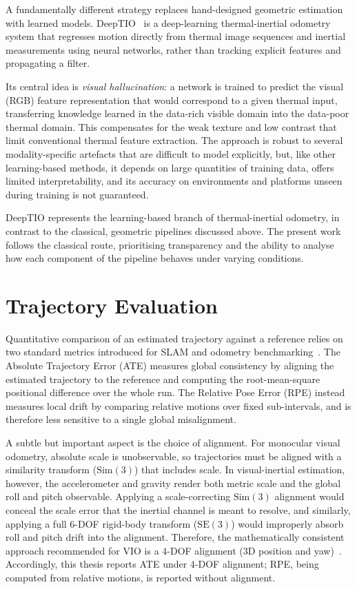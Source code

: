 A fundamentally different strategy replaces hand-designed geometric estimation with learned models. DeepTIO~\cite{Saputra_2020} is a deep-learning thermal-inertial odometry system that regresses motion directly from thermal image sequences and inertial measurements using neural networks, rather than tracking explicit features and propagating a filter.

Its central idea is \emph{visual hallucination}: a network is trained to predict the visual (RGB) feature representation that would correspond to a given thermal input, transferring knowledge learned in the data-rich visible domain into the data-poor thermal domain. This compensates for the weak texture and low contrast that limit conventional thermal feature extraction. The approach is robust to several modality-specific artefacts that are difficult to model explicitly, but, like other learning-based methods, it depends on large quantities of training data, offers limited interpretability, and its accuracy on environments and platforms unseen during training is not guaranteed.

DeepTIO represents the learning-based branch of thermal-inertial odometry, in contrast to the classical, geometric pipelines discussed above. The present work follows the classical route, prioritising transparency and the ability to analyse how each component of the pipeline behaves under varying conditions.

\section{Trajectory Evaluation}
\label{sec:rw_eval}

Quantitative comparison of an estimated trajectory against a reference relies on two standard metrics introduced for SLAM and odometry benchmarking~\cite{Sturm_2012}. The Absolute Trajectory Error (ATE) measures global consistency by aligning the estimated trajectory to the reference and computing the root-mean-square positional difference over the whole run. The Relative Pose Error (RPE) instead measures local drift by comparing relative motions over fixed sub-intervals, and is therefore less sensitive to a single global misalignment.

A subtle but important aspect is the choice of alignment. For monocular visual odometry, absolute scale is unobservable, so trajectories must be aligned with a similarity transform ($\mathrm{Sim}(3)$) that includes scale. In visual-inertial estimation, however, the accelerometer and gravity render both metric scale and the global roll and pitch observable. Applying a scale-correcting $\mathrm{Sim}(3)$ alignment would conceal the scale error that the inertial channel is meant to resolve, and similarly, applying a full 6-DOF rigid-body transform ($\mathrm{SE}(3)$) would improperly absorb roll and pitch drift into the alignment. Therefore, the mathematically consistent approach recommended for VIO is a 4-DOF alignment (3D position and yaw)~\cite{Zhang_2018}. Accordingly, this thesis reports ATE under $4$-DOF alignment; RPE, being computed from relative motions, is reported without alignment.

